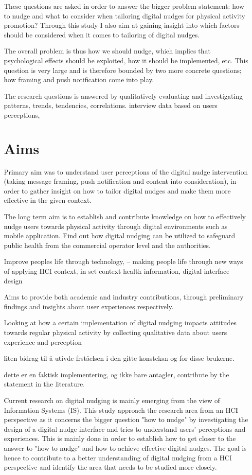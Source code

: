 These questions are asked in order to answer the bigger problem statement: how to nudge and what to consider when tailoring digital nudges for physical activity promotion? Through this study I also aim at gaining insight into which factors should be considered when it comes to tailoring of digital nudges.  

The overall problem is thus how we should nudge, which implies that psychological effects should be exploited, how it should be implemented, etc. This question is very large and is therefore bounded by two more concrete questions; how framing and push notification come into play.

The research questions is answered by qualitatively evaluating and investigating patterns, trends, tendencies, correlations. interview data based on users perceptions,  

\section{Aims}
Primary aim was to understand user perceptions of the digital nudge intervention (taking message framing, push notification and content into consideration), in order to gather insight on how to tailor digital nudges and make them more effective in the given context. 

The long term aim is to establish and contribute knowledge on how to effectively nudge users towards physical activity through digital environments such as mobile application. Find out how digital nudging can be utilized to safeguard public health from the commercial operator level and the authorities. 

Improve peoples life through technology, -- making people life through new ways of applying HCI context, in set context health information, digital interface design

Aims to provide both academic and industry contributions, through preliminary findings and insights about user experiences respectively. 

Looking at how a certain implementation of digital nudging impacts attitudes towards regular physical activity by collecting qualitative data about users experience and perception

liten bidrag til å utivde frståelsen i den gitte konsteksn og for disse brukerne. 

dette er en faktisk implementering, og ikke bare antagler, contribute by the statement in the literature. 

Current research on digital nudging is mainly emerging from the view of Information Systems (IS). This study approach the research area from an HCI perspective as it concerns the bigger question "how to nudge" by investigating the design of a digital nudge interface and tries to understand users' perceptions and experiences. This is mainly done in order to establish how to get closer to the answer to "how to nudge" and how to achieve effective digital nudges. The goal is hence to contribute to a better understanding of digital nudging from a HCI perspective and identify the area that needs to be studied more closely. 

